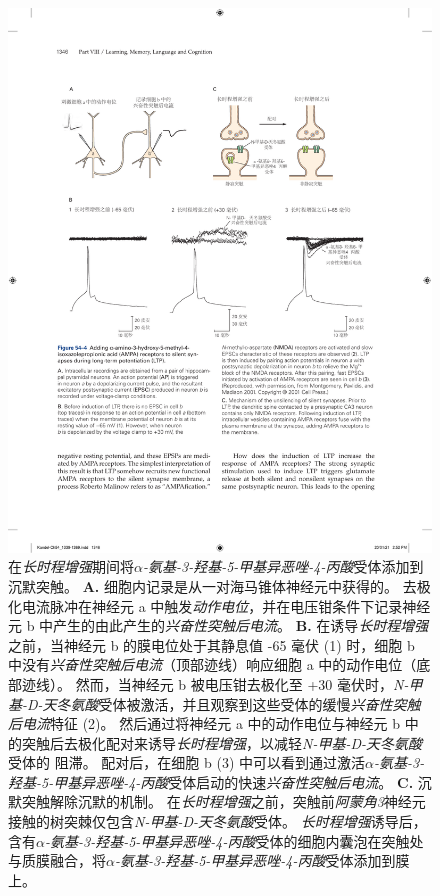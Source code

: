\begin{figure}[htbp]
	\centering
	\includegraphics[width=1.0\linewidth]{chap54/fig_54_4}
	\caption{在\textit{长时程增强}期间将\textit{$\alpha$-氨基-3-羟基-5-甲基异恶唑-4-丙酸}受体添加到沉默突触。
		\textbf{A.} 细胞内记录是从一对海马锥体神经元中获得的。 去极化电流脉冲在神经元 a 中触发\textit{动作电位}，并在电压钳条件下记录神经元 b 中产生的由此产生的\textit{兴奋性突触后电流}。
		\textbf{B.} 在诱导\textit{长时程增强}之前，当神经元 b 的膜电位处于其静息值 -65 毫伏 (1) 时，细胞 b 中没有\textit{兴奋性突触后电流}（顶部迹线）响应细胞 a 中的动作电位（底部迹线）。
		然而，当神经元 b 被电压钳去极化至 +30 毫伏时，\textit{N-甲基-D-天冬氨酸}受体被激活，并且观察到这些受体的缓慢\textit{兴奋性突触后电流}特征 (2)。
		然后通过将神经元 a 中的动作电位与神经元 b 中的突触后去极化配对来诱导\textit{长时程增强}，以减轻\textit{N-甲基-D-天冬氨酸}受体的  阻滞。
		配对后，在细胞 b (3) 中可以看到通过激活\textit{$\alpha$-氨基-3-羟基-5-甲基异恶唑-4-丙酸}受体启动的快速\textit{兴奋性突触后电流}\cite{montgomery2001pair}。
		\textbf{C.} 沉默突触解除沉默的机制。
		在\textit{长时程增强}之前，突触前\textit{阿蒙角3}神经元接触的树突棘仅包含\textit{N-甲基-D-天冬氨酸}受体。
		\textit{长时程增强}诱导后，含有\textit{$\alpha$-氨基-3-羟基-5-甲基异恶唑-4-丙酸}受体的细胞内囊泡在突触处与质膜融合，将\textit{$\alpha$-氨基-3-羟基-5-甲基异恶唑-4-丙酸}受体添加到膜上。}
	\label{fig:54_4}
\end{figure}


